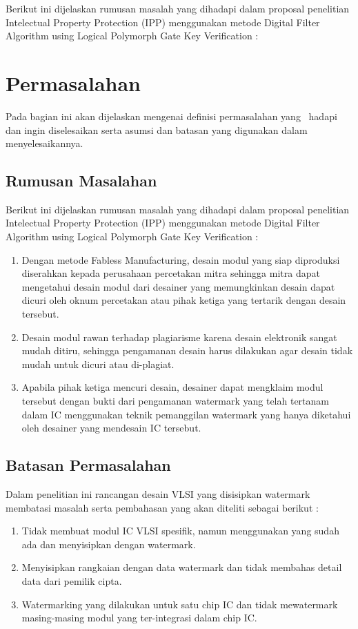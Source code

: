 Berikut ini dijelaskan rumusan masalah yang dihadapi dalam proposal penelitian Intelectual Property Protection (IPP) menggunakan metode Digital Filter Algorithm using Logical Polymorph Gate Key Verification :

\section{Permasalahan}
Pada bagian ini akan dijelaskan mengenai definisi permasalahan yang \saya~hadapi dan ingin diselesaikan serta asumsi dan batasan yang digunakan dalam menyelesaikannya.

\subsection{Rumusan Masalahan}
Berikut ini dijelaskan rumusan masalah yang dihadapi dalam proposal
penelitian Intelectual Property Protection (IPP) menggunakan metode Digital
Filter Algorithm using Logical Polymorph Gate Key Verification :

\begin{enumerate}
	\item Dengan metode Fabless Manufacturing, desain modul yang siap
	diproduksi diserahkan kepada perusahaan percetakan mitra sehingga
	mitra dapat mengetahui desain modul dari desainer yang
	memungkinkan desain dapat dicuri oleh oknum percetakan atau pihak
	ketiga yang tertarik dengan desain tersebut.
	
	\item Desain modul rawan terhadap plagiarisme karena desain elektronik
	sangat mudah ditiru, sehingga pengamanan desain harus dilakukan agar
	desain tidak mudah untuk dicuri atau di-plagiat.
	
	\item Apabila pihak ketiga mencuri desain, desainer dapat mengklaim modul
	tersebut dengan bukti dari pengamanan watermark yang telah tertanam
	dalam IC menggunakan teknik pemanggilan watermark yang hanya
	diketahui oleh desainer yang mendesain IC tersebut.
\end{enumerate}

\subsection{Batasan Permasalahan}
Dalam penelitian ini rancangan desain VLSI yang disisipkan watermark
membatasi masalah serta pembahasan yang akan diteliti sebagai berikut :

\begin{enumerate}
	\item Tidak membuat modul IC VLSI spesifik, namun menggunakan yang
	sudah ada dan menyisipkan dengan watermark.
	
	\item Menyisipkan rangkaian dengan data watermark dan tidak membahas
	detail data dari pemilik cipta.
	
	\item Watermarking yang dilakukan untuk satu chip IC dan tidak mewatermark
	masing-masing modul yang ter-integrasi dalam chip IC. 
\end{enumerate}

